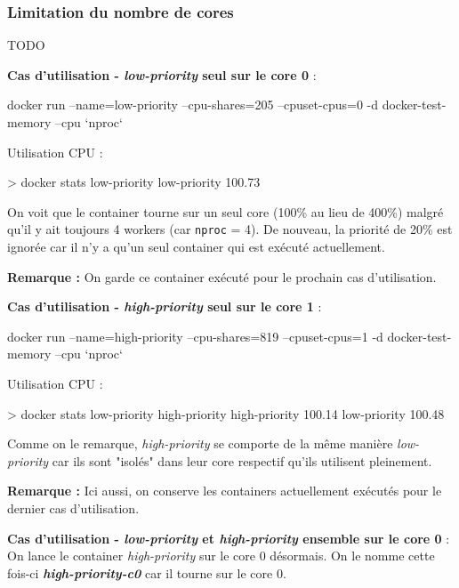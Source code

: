 \documentclass[11pt,a4paper,oneside]{report}
\newcommand{\code}[1]{\texttt{#1}}
\begin{document}
\subsubsection{Limitation du nombre de cores}
TODO

\textbf{Cas d'utilisation - \textit{low-priority} seul sur le core 0} :

\begin{textcode}
docker run --name=low-priority --cpu-shares=205 --cpuset-cpus=0 -d docker-test-memory --cpu `nproc`
\end{textcode}

Utilisation CPU :
\begin{textcode}
> docker stats low-priority
low-priority   100.73%
\end{textcode}

On voit que le container tourne sur un seul core (100\% au lieu de 400\%) malgré qu'il y ait toujours 4 workers (car \code{nproc} = 4). De nouveau, la priorité de 20\% est ignorée car il n'y a qu'un seul container qui est exécuté actuellement.

\textbf{Remarque :} On garde ce container exécuté pour le prochain cas d'utilisation.

\textbf{Cas d'utilisation - \textit{high-priority} seul sur le core 1} :

\begin{textcode}
docker run --name=high-priority --cpu-shares=819 --cpuset-cpus=1 -d docker-test-memory --cpu `nproc`
\end{textcode}

Utilisation CPU :

\begin{textcode}
> docker stats low-priority high-priority 
high-priority   100.14%
low-priority    100.48%
\end{textcode}

Comme on le remarque, \textit{high-priority} se comporte de la même manière \textit{low-priority} car ils sont "isolés" dans leur core respectif qu'ils utilisent pleinement.

\textbf{Remarque :} Ici aussi, on conserve les containers actuellement exécutés pour le dernier cas d'utilisation.

\textbf{Cas d'utilisation - \textit{low-priority} et \textit{high-priority} ensemble sur le core 0} :
On lance le container \textit{high-priority} sur le core 0 désormais. On le nomme cette fois-ci \textbf{\textit{high-priority-c0}} car il tourne sur le core 0.
\end{document}
